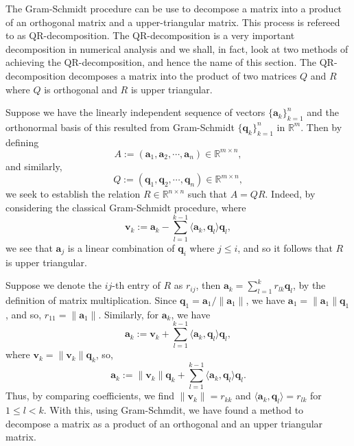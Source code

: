 \documentclass[
]{article}
\theoremstyle{definition}
\theoremstyle{definition}
\begin{document}
The Gram-Schmidt procedure can be use to decompose a matrix into a
product of an orthogonal matrix and a upper-triangular matrix. This
process is refereed to as QR-decomposition. The QR-decomposition is a
very important decomposition in numerical analysis and we shall, in
fact, look at two methods of achieving the QR-decomposition, and hence
the name of this section. The QR-decomposition decomposes a matrix into
the product of two matrices \(Q\) and \(R\) where \(Q\) is orthogonal
and \(R\) is upper triangular.

Suppose we have the linearly independent sequence of vectors
\(\{\mathbf{a}_k\}_{k = 1}^n\) and the orthonormal basis of this
resulted from Gram-Schmidt \(\{\mathbf{q}_k\}_{k = 1}^n\) in
\(\mathbb{R}^m\). Then by defining
\[A := (\mathbf{a}_1, \mathbf{a}_2, \cdots, \mathbf{a}_n) \in \mathbb{R}^{m \times n},\]
and similarly,
\[Q := (\mathbf{q}_1, \mathbf{q}_2, \cdots, \mathbf{q}_n) \in \mathbb{R}^{m \times n},\]
we seek to establish the relation \(R \in \mathbb{R}^{n \times n}\) such
that \(A = QR\). Indeed, by considering the classical Gram-Schmidt
procedure, where
\[\mathbf{v}_k := \mathbf{a}_k - \sum_{l = 1}^{k-1} \langle \mathbf{a}_k, 
        \mathbf{q}_l \rangle \mathbf{q}_l,\] we see that
\(\mathbf{a}_j\) is a linear combination of \(\mathbf{q}_i\) where
\(j \le i\), and so it follows that \(R\) is upper triangular.

Suppose we denote the \(ij\)-th entry of \(R\) as \(r_{ij}\), then
\(\mathbf{a}_k = \sum_{l = 1}^k r_{lk}\mathbf{q}_l\), by the definition
of matrix multiplication. Since
\(\mathbf{q}_1 = \mathbf{a}_1 / \|\mathbf{a}_1\|\), we have
\(\mathbf{a}_1 = \|\mathbf{a}_1\| \mathbf{q}_1\), and so,
\(r_{11} = \|\mathbf{a}_1\|\). Similarly, for \(\mathbf{a}_k\), we have
\[\mathbf{a}_k := \mathbf{v}_k + \sum_{l = 1}^{k-1} \langle \mathbf{a}_k, 
        \mathbf{q}_l \rangle \mathbf{q}_l,\] where
\(\mathbf{v}_k = \|\mathbf{v}_k\| \mathbf{q}_k\), so,
\[\mathbf{a}_k := \|\mathbf{v}_k\|\mathbf{q}_k + \sum_{l = 1}^{k-1} \langle \mathbf{a}_k, 
        \mathbf{q}_l \rangle \mathbf{q}_l.\] Thus, by comparing
coefficients, we find \(\|\mathbf{v}_k\| = r_{kk}\) and
\(\langle \mathbf{a}_k, \mathbf{q}_l \rangle = r_{lk}\) for
\(1 \le l < k\). With this, using Gram-Schmdit, we have found a method
to decompose a matrix as a product of an orthogonal and an upper
triangular matrix.
\end{document}
